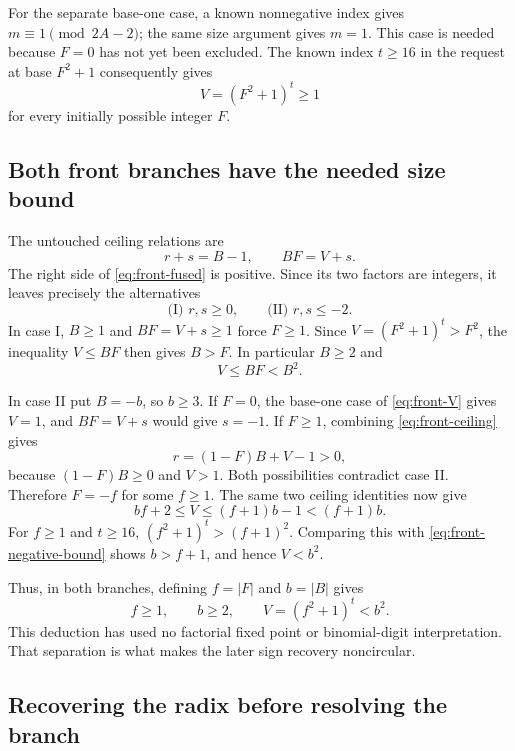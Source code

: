 \documentclass[11pt,letterpaper]{article}
\theoremstyle{definition}
\theoremstyle{remark}
\begin{document}
For the separate base-one case, a known nonnegative index gives
$m\equiv1\pmod{2A-2}$; the same size argument gives $m=1$.
This case is needed because $F=0$ has not yet been excluded.  The known
index $t\geq16$ in the request at base $F^2+1$ consequently gives
\begin{equation}
 V=(F^2+1)^t\geq1
 \label{eq:front-V}
\end{equation}
for every initially possible integer $F$.

\subsection{Both front branches have the needed size bound}

The untouched ceiling relations are
\begin{equation}
 r+s=B-1,\qquad BF=V+s.
 \label{eq:front-ceiling}
\end{equation}
The right side of \eqref{eq:front-fused} is positive.  Since its two
factors are integers, it leaves precisely the alternatives
\[
 \text{(I) }r,s\geq0,
 \qquad
 \text{(II) }r,s\leq-2.
\]
In case I, $B\geq1$ and $BF=V+s\geq1$ force $F\geq1$.
Since $V=(F^2+1)^t>F^2$, the inequality $V\leq BF$ then gives
$B>F$.  In particular $B\geq2$ and
\[
 V\leq BF<B^2.
\]

In case II put $B=-b$, so $b\geq3$.  If $F=0$, the base-one case of
\eqref{eq:front-V} gives $V=1$, and $BF=V+s$ would give $s=-1$.
If $F\geq1$, combining \eqref{eq:front-ceiling} gives
\[
 r=(1-F)B+V-1>0,
\]
because $(1-F)B\geq0$ and $V>1$.  Both possibilities contradict
case II.  Therefore $F=-f$ for some $f\geq1$.  The same two ceiling
identities now give
\begin{equation}
 bf+2\leq V\leq(f+1)b-1<(f+1)b.
 \label{eq:front-negative-bound}
\end{equation}
For $f\geq1$ and $t\geq16$, $(f^2+1)^t>(f+1)^2$.
Comparing this with \eqref{eq:front-negative-bound} shows $b>f+1$,
and hence $V<b^2$.

Thus, in both branches, defining $f=|F|$ and $b=|B|$ gives
\begin{equation}
 f\geq1,\qquad b\geq2,\qquad V=(f^2+1)^t<b^2.
 \label{eq:front-uniform}
\end{equation}
This deduction has used no factorial fixed point or binomial-digit
interpretation.  That separation is what makes the later sign recovery
noncircular.

\subsection{Recovering the radix before resolving the branch}
\end{document}
